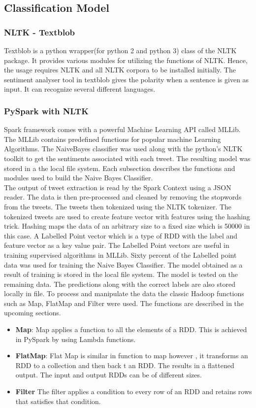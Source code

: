 \documentclass[9pt,twocolumn,twoside]{../../styles/osajnl}
\begin{document}
\subsection{Classification Model}
\subsubsection{NLTK - Textblob}
Textblob is a python wrapper(for python 2 and python 3) class of the NLTK package. It provides various modules for utilizing the functions of NLTK. Hence, the usage requires NLTK and all NLTK corpora to be installed initially. The sentiment analyser tool in textblob gives the polarity when a sentence is given as input. It can recognize several different languages. 
\subsubsection{PySpark with NLTK}
Spark framework comes with a powerful Machine Learning API called MLLib. The MLLib contains predefined functions for popular machine Learning Algorithms. The NaiveBayes classifier was used along with the python's NLTK toolkit to get the sentiments associated with each tweet. The resulting model was stored in a the local file system.  Each subsection describes the functions and modules used to build the Naive Bayes Classifier.\\
The output of tweet extraction is read by the Spark Context using a JSON reader. The data is then pre-processed and cleaned by removing the stopwords from the tweets. The tweets then  tokenized using the NLTK tokenizer. The tokenized tweets are used to create feature vector with  features using the hashing trick. Hashing maps the data of an arbitrary size to a fixed size which is 50000 in this case. A Labelled Point vector which is a type of RDD with the label and feature vector as a key value pair. The Labelled Point vectors are useful in training supervised algorithms in MLLib. Sixty percent of the Labelled point data was used for training the Naive Bayes Classifier. The model obtained as a result of training is stored in the local file system. The model is tested on the remaining data. The predictions along with the correct labels are also stored locally in file. To process and manipulate the data the classic Hadoop functions such as Map, FlatMap and Filter were used. The functions are described in the upcoming sections.
\begin{itemize}
    \item \textbf{Map}: Map applies a function to all the elements of a RDD. This is achieved in PySpark by using Lambda functions. 
    \item \textbf{FlatMap}: Flat Map is similar in function to map however  , it transforms an RDD to a collection and then back t an RDD. The results in a flattened output. The input and output RDDs can be of different sizes. 
    \item \textbf{Filter} The filter applies a condition to every row of an RDD and retains rows that satisfies that condition.
\end{itemize}
\end{document}
